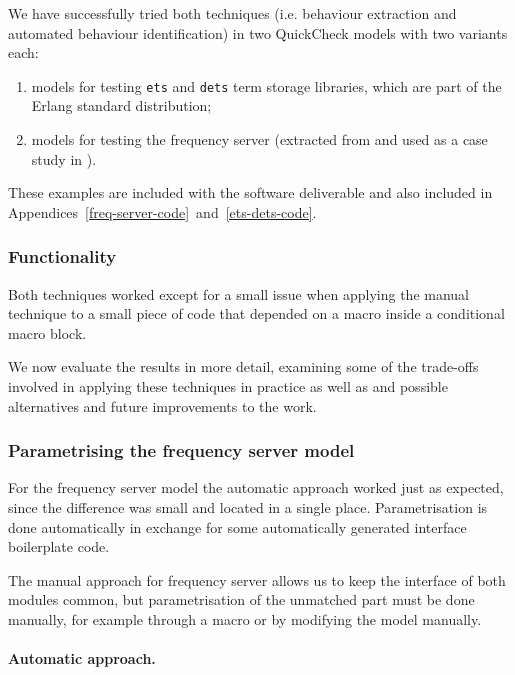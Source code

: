 We have successfully tried both techniques  (i.e. behaviour extraction and 
automated behaviour identification) in two QuickCheck models with two variants 
each:

\begin{enumerate}
 \item models for testing \texttt{ets} and \texttt{dets} term storage libraries, 
which are part 
of 
the Erlang standard distribution;
 \item models for testing the frequency server (extracted from 
\cite{CesariniThompson} and used as a case study in \cite{ExtractingQC}).
\end{enumerate}
These examples are included with the software deliverable and also 
included in Appendices~\ref{freq-server-code}~and~\ref{ets-dets-code}.

\subsubsection{Functionality}

Both techniques worked except for a small issue when applying the manual 
technique to a small piece of code that 
depended on a macro inside a conditional macro block. 

We now evaluate the results in more detail, examining some of the trade-offs 
involved in applying these techniques in practice as well as and 
possible alternatives and future improvements to the work.

\subsubsection{Parametrising the frequency server model}

For the frequency server model the automatic approach worked just as expected, 
since the difference was small and located in a single place. Parametrisation 
is done automatically in exchange for some automatically generated interface 
boilerplate code.

The manual approach for frequency server allows us to keep the 
interface of both modules {\color{red}common}, but parametrisation of the 
unmatched part must be done manually, for example through a macro or by 
modifying the model manually.

\paragraph{Automatic approach.}

